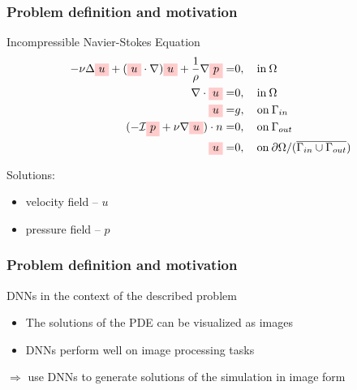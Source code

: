 \documentclass[18pt]{beamer}
\begin{document}
\begin{frame}[t]
  \frametitle{Problem definition and motivation}
  \vspace*{-0.5cm}
  \begin{block}{Incompressible Navier-Stokes Equation}
    \begin{align*}
      -\nu\Delta \tikz[baseline]{
            \node[fill=red!20,anchor=base] (t1)
            {$u$};} + (\tikz[baseline]{
            \node[fill=red!20,anchor=base] (t1)
            {$u$};}\cdot\nabla)\tikz[baseline]{
            \node[fill=red!20,anchor=base] (t1)
            {$u$};} + \frac{1}{\rho}\nabla \tikz[baseline]{
            \node[fill=red!20,anchor=base] (t1)
            {$p$};} =& 0,  \quad\text{in}\: \Omega\\
      \nabla\cdot \tikz[baseline]{
            \node[fill=red!20,anchor=base] (t1)
            {$u$};} =& 0, \quad\text{in}\: \Omega \\
      \tikz[baseline]{
            \node[fill=red!20,anchor=base] (t1)
            {$u$};} =& g, \quad\text{on}\: \Gamma_{in} \\
      (-\mathcal{I}\tikz[baseline]{
            \node[fill=red!20,anchor=base] (t1)
            {$p$};} + \nu\nabla \tikz[baseline]{
            \node[fill=red!20,anchor=base] (t1)
            {$u$};})\cdot n =& 0, \quad\text{on}\: \Gamma_{out} \\
      \tikz[baseline]{
            \node[fill=red!20,anchor=base] (t1)
            {$u$};} =& 0, \quad\text{on}\:  \partial\Omega\slash (\overline{\Gamma_{in}\cup\Gamma_{out}})
  \end{align*}
\end{block}
Solutions:
\begin{itemize}
\item velocity field -- $u$
\item pressure field -- $p$
\end{itemize}
\end{frame}


\begin{frame}[t]
  \frametitle{Problem definition and motivation}
  DNNs in the context of the described problem
  \begin{itemize}
  \item The solutions of the PDE can be visualized as images
  \item DNNs perform well on image processing tasks
  \end{itemize}
  \pause
  $\Longrightarrow$ use DNNs to generate solutions of the simulation in image form \\
\end{frame}
\end{document}
